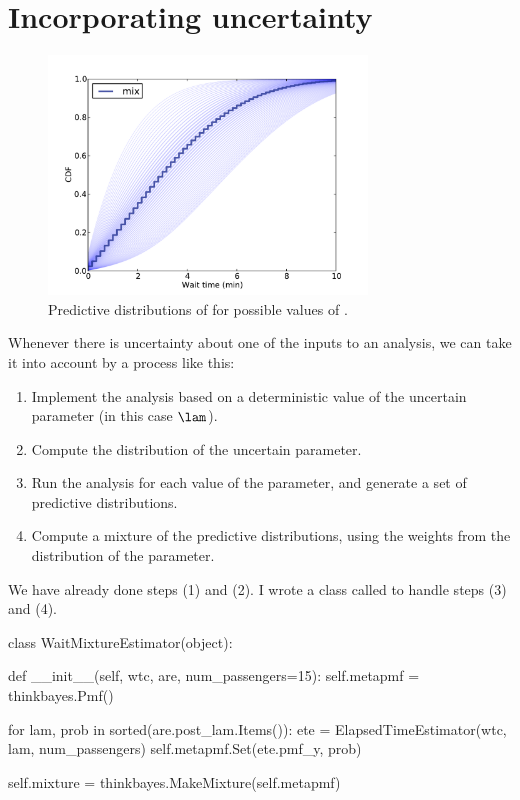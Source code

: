 \documentclass[12pt]{book}
\theoremstyle{exercise}
\begin{document}
\section{Incorporating uncertainty}

\begin{figure}
\centerline{\includegraphics[height=2.5in]{figs/redline4.pdf}}
\caption{Predictive distributions of  for possible values
  of . }
\label{fig.redline4}
\end{figure}

Whenever there is uncertainty about one of the inputs to an analysis,
we can take it into account by a process like this:

\begin{enumerate}

\item Implement the analysis based on a deterministic value of the
  uncertain parameter (in this case $\lam$).

\item Compute the distribution of the uncertain parameter.

\item Run the analysis for each value of the parameter, and generate a
  set of predictive distributions.

\item Compute a mixture of the predictive distributions, using the
  weights from the distribution of the parameter.

\end{enumerate}

We have already done steps (1) and (2).  I wrote a class
called  to handle steps (3) and (4).

\begin{code}
class WaitMixtureEstimator(object):

    def __init__(self, wtc, are, num_passengers=15):
        self.metapmf = thinkbayes.Pmf()

        for lam, prob in sorted(are.post_lam.Items()):
            ete = ElapsedTimeEstimator(wtc, lam, num_passengers)
            self.metapmf.Set(ete.pmf_y, prob)

        self.mixture = thinkbayes.MakeMixture(self.metapmf)
\end{code}
\end{document}
